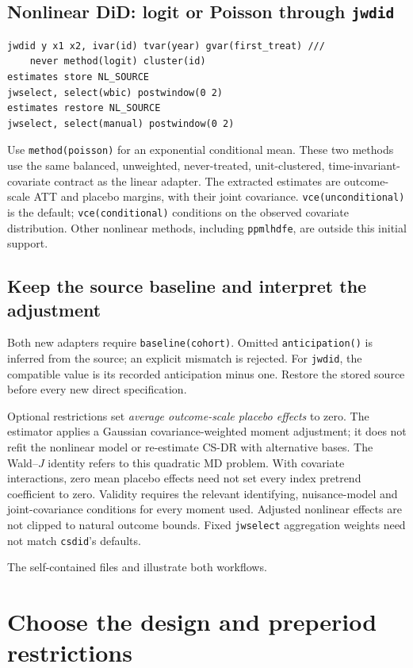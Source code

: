 \documentclass[11pt]{article}
\newcommand{\cmd}[1]{\texttt{#1}}
\begin{document}
\subsection*{Nonlinear DiD: logit or Poisson through \texttt{jwdid}}
\begin{lstlisting}
jwdid y x1 x2, ivar(id) tvar(year) gvar(first_treat) ///
    never method(logit) cluster(id)
estimates store NL_SOURCE
jwselect, select(wbic) postwindow(0 2)
estimates restore NL_SOURCE
jwselect, select(manual) postwindow(0 2)
\end{lstlisting}
Use \cmd{method(poisson)} for an exponential conditional mean. These two
methods use the same balanced, unweighted, never-treated, unit-clustered,
time-invariant-covariate contract as the linear adapter. The extracted
estimates are outcome-scale ATT and placebo margins, with their joint
covariance. \cmd{vce(unconditional)} is the default; \cmd{vce(conditional)}
conditions on the observed covariate distribution. Other nonlinear methods,
including \cmd{ppmlhdfe}, are outside this initial support.

\subsection*{Keep the source baseline and interpret the adjustment}
Both new adapters require \cmd{baseline(cohort)}. Omitted
\cmd{anticipation()} is inferred from the source; an explicit mismatch is
rejected. For \cmd{jwdid}, the compatible value is its recorded anticipation
minus one. Restore the stored source before every new direct specification.

Optional restrictions set \emph{average outcome-scale placebo effects} to
zero. The estimator applies a Gaussian covariance-weighted moment adjustment;
it does not refit the nonlinear model or re-estimate CS-DR with alternative
bases. The Wald--$J$ identity refers to this quadratic MD problem. With
covariate interactions, zero mean placebo effects need not set every index
pretrend coefficient to zero. Validity requires the relevant identifying,
nuisance-model and joint-covariance conditions for every moment used.
Adjusted nonlinear effects are not clipped to natural outcome bounds.
Fixed \cmd{jwselect} aggregation weights need not match \cmd{csdid}'s defaults.

The self-contained files  and
 illustrate both workflows.

\newpage
\section{Choose the design and preperiod restrictions}
\end{document}
